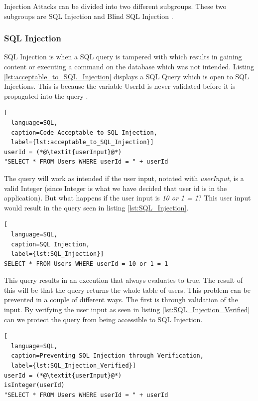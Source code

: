 Injection Attacks can be divided into two different subgroups. These two subgroups are SQL Injection and Blind SQL Injection \parencite{Secure_Web}.



\subsubsection{SQL Injection}
SQL Injection is when a SQL query is tampered with which results in gaining content or executing a command on the database which was not intended. Listing \ref{lst:acceptable_to_SQL_Injection} displays a SQL Query which is open to SQL Injections. This is because the variable UserId is never validated before it is propagated into the query \parencite{JustinClarke-Salt2009SIAa, Secure_Web}.

\hfill
\begin{lstlisting}[
  language=SQL,
  caption=Code Acceptable to SQL Injection,
  label={lst:acceptable_to_SQL_Injection}]
userId = (*@\textit{userInput}@*)
"SELECT * FROM Users WHERE userId = " + userId
\end{lstlisting}
\hfill

The query will work as intended if the user input, notated with \textit{userInput}, is a valid Integer (since Integer is what we have decided that user id is in the application). But what happens if the user input is \textit{10 or 1 = 1}? This user input would result in the query seen in listing \ref{lst:SQL_Injection}.

\hfill
\begin{lstlisting}[
  language=SQL,
  caption=SQL Injection,
  label={lst:SQL_Injection}]
SELECT * FROM Users WHERE userId = 10 or 1 = 1
\end{lstlisting}
\hfill

This query results in an execution that always evaluates to true. The result of this will be that the query returns the whole table of users. This problem can be prevented in a couple of different ways. The first is through validation of the input. By verifying the user input as seen in listing \ref{lst:SQL_Injection_Verified} can we protect the query from being accessible to SQL Injection.

\hfill
\begin{lstlisting}[
  language=SQL,
  caption=Preventing SQL Injection through Verification,
  label={lst:SQL_Injection_Verified}]
userId = (*@\textit{userInput}@*)
isInteger(userId)
"SELECT * FROM Users WHERE userId = " + userId
\end{lstlisting}
\hfill

